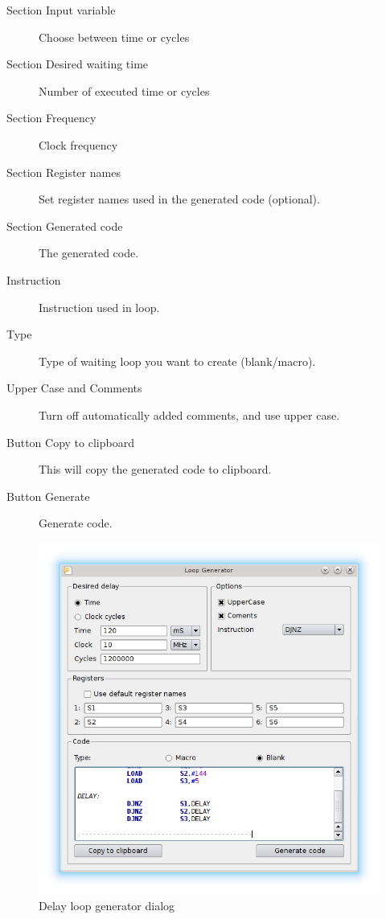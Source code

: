     \begin{description}
        \item[Section Input variable] Choose between time or cycles
        \item[Section Desired waiting time] Number of executed time or cycles
        \item[Section Frequency] Clock frequency
        \item[Section Register names] Set register names used in the generated code (optional).
        \item[Section Generated code] The generated code.
        \item[Instruction] Instruction used in loop.
        \item[Type] Type of waiting loop you want to create (blank/macro).
        \item[Upper Case and Comments]  Turn off automatically added comments, and use upper case.
        \item[Button Copy to clipboard] This will copy the generated code to clipboard.
        \item[Button Generate] Generate code.
    \end{description}

    \begin{figure}[h]
        \centering
        \includegraphics[width=.6\textwidth]{img/loop_gen.png}
        \caption{Delay loop generator dialog}
    \end{figure}


